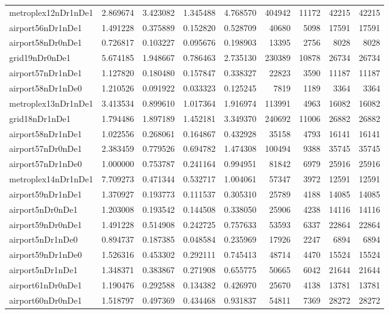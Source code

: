 \begin{longtable}{|l|r|r|r|r|r|r|r|r|}
metroplex12nDr1nDe1 & 2.869674 & 3.423082 & 1.345488 & 4.768570 & 404942 & 11172 & 42215 & 42215 \\
airport56nDr1nDe1 & 1.491228 & 0.375889 & 0.152820 & 0.528709 & 40680 & 5098 & 17591 & 17591 \\
airport58nDr0nDe1 & 0.726817 & 0.103227 & 0.095676 & 0.198903 & 13395 & 2756 & 8028 & 8028 \\
grid19nDr0nDe1 & 5.674185 & 1.948667 & 0.786463 & 2.735130 & 230389 & 10878 & 26734 & 26734 \\
airport57nDr1nDe1 & 1.127820 & 0.180480 & 0.157847 & 0.338327 & 22823 & 3590 & 11187 & 11187 \\
airport58nDr1nDe0 & 1.210526 & 0.091922 & 0.033323 & 0.125245 & 7819 & 1189 & 3364 & 3364 \\
metroplex13nDr1nDe1 & 3.413534 & 0.899610 & 1.017364 & 1.916974 & 113991 & 4963 & 16082 & 16082 \\
grid18nDr1nDe1 & 1.794486 & 1.897189 & 1.452181 & 3.349370 & 240692 & 11006 & 26882 & 26882 \\
airport58nDr1nDe1 & 1.022556 & 0.268061 & 0.164867 & 0.432928 & 35158 & 4793 & 16141 & 16141 \\
airport57nDr0nDe1 & 2.383459 & 0.779526 & 0.694782 & 1.474308 & 100494 & 9388 & 35745 & 35745 \\
airport57nDr1nDe0 & 1.000000 & 0.753787 & 0.241164 & 0.994951 & 81842 & 6979 & 25916 & 25916 \\
metroplex14nDr1nDe1 & 7.709273 & 0.471344 & 0.532717 & 1.004061 & 57347 & 3972 & 12591 & 12591 \\
airport59nDr1nDe1 & 1.370927 & 0.193773 & 0.111537 & 0.305310 & 25789 & 4188 & 14085 & 14085 \\
airport5nDr0nDe1 & 1.203008 & 0.193542 & 0.144508 & 0.338050 & 25906 & 4238 & 14116 & 14116 \\
airport59nDr0nDe1 & 1.491228 & 0.514908 & 0.242725 & 0.757633 & 53593 & 6337 & 22864 & 22864 \\
airport5nDr1nDe0 & 0.894737 & 0.187385 & 0.048584 & 0.235969 & 17926 & 2247 & 6894 & 6894 \\
airport59nDr1nDe0 & 1.526316 & 0.453302 & 0.292111 & 0.745413 & 48714 & 4470 & 15524 & 15524 \\
airport5nDr1nDe1 & 1.348371 & 0.383867 & 0.271908 & 0.655775 & 50665 & 6042 & 21644 & 21644 \\
airport61nDr0nDe1 & 1.190476 & 0.292588 & 0.134382 & 0.426970 & 25670 & 4138 & 13781 & 13781 \\
airport60nDr0nDe1 & 1.518797 & 0.497369 & 0.434468 & 0.931837 & 54811 & 7369 & 28272 & 28272 \\

\end{longtable}
